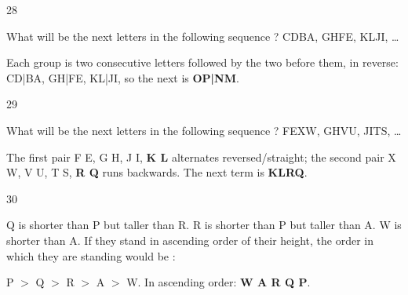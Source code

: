 \begin{question}{28}
{What will be the next letters in the following sequence ? CDBA, GHFE, KLJI, \ldots{}\par}
\begin{explain}
Each group is two consecutive letters followed by the two before them, in reverse: CD|BA, GH|FE, KL|JI, so the next is \textbf{OP|NM}.
\end{explain}
\end{question}

\begin{question}{29}
{What will be the next letters in the following sequence ? FEXW, GHVU, JITS, \ldots{}\par}
\begin{explain}
The first pair F E, G H, J I, \textbf{K L} alternates reversed/straight; the second pair X W, V U, T S, \textbf{R Q} runs backwards. The next term is \textbf{KLRQ}.
\end{explain}
\end{question}

\begin{question}{30}
{Q is shorter than P but taller than R. R is shorter than P but taller than A. W is shorter than A. If they stand in ascending order of their height, the order in which they are standing would be :\par}
\begin{explain}
P $>$ Q $>$ R $>$ A $>$ W. In ascending order: \textbf{W A R Q P}.
\end{explain}
\end{question}

